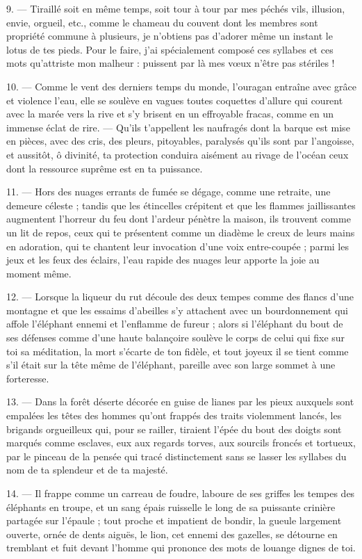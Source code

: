 \documentclass[a4paper, 11pt, oneside, french, landscape, twocolumn]{article}
\begin{document}
9. --- Tiraillé soit en même temps, soit tour à tour par mes péchés vils, illusion, envie, orgueil, etc., comme le chameau du couvent dont les membres sont propriété commune à plusieurs, je n'obtiens pas d'adorer même un instant le lotus de tes pieds. Pour le faire, j'ai spécialement composé ces syllabes et ces mots qu'attriste mon malheur : puissent par là mes vœux n'être pas stériles !

10. --- Comme le vent des derniers temps du monde, l'ouragan entraîne avec grâce et violence l'eau, elle se soulève en vagues toutes coquettes d'allure qui courent avec la marée vers la rive et s'y brisent en un effroyable fracas, comme en un immense éclat de rire. --- Qu'ils t'appellent les naufragés dont la barque est mise en pièces, avec des cris, des pleurs, pitoyables, paralysés qu'ils sont par l'angoisse, et aussitôt, ô divinité, ta protection conduira aisément au rivage de l'océan ceux dont la ressource suprême est en ta puissance.

11. --- Hors des nuages errants de fumée se dégage, comme une retraite, une demeure céleste ; tandis que les étincelles crépitent et que les flammes jaillissantes augmentent l'horreur du feu dont l'ardeur pénètre la maison, ils trouvent comme un lit de repos, ceux qui te présentent comme un diadème le creux de leurs mains en adoration, qui te chantent leur invocation d'une voix entre-coupée ; parmi les jeux et les feux des éclairs, l'eau rapide des nuages leur apporte la joie au moment même.

12. --- Lorsque la liqueur du rut découle des deux tempes comme des flancs d'une montagne et que les essaims d'abeilles s'y attachent avec un bourdonnement qui affole l'éléphant ennemi et l'enflamme de fureur ; alors si l'éléphant du bout de ses défenses comme d'une haute balançoire soulève le corps de celui qui fixe sur toi sa méditation, la mort s'écarte de ton fidèle, et tout joyeux il se tient comme s'il était sur la tête même de l'éléphant, pareille avec son large sommet à une forteresse.

13. --- Dans la forêt déserte décorée en guise de lianes par les pieux auxquels sont empalées les têtes des hommes qu'ont frappés des traits violemment lancés, les brigands orgueilleux qui, pour se railler, tiraient l'épée du bout des doigts sont marqués comme esclaves, eux aux regards torves, aux sourcils froncés et tortueux, par le pinceau de la pensée qui tracé distinctement sans se lasser les syllabes du nom de ta splendeur et de ta majesté.

14. --- Il frappe comme un carreau de foudre, laboure de ses griffes les tempes des éléphants en troupe, et un sang épais ruisselle le long de sa puissante crinière partagée sur l'épaule ; tout proche et impatient de bondir, la gueule largement ouverte, ornée de dents aiguës, le lion, cet ennemi des gazelles, se détourne en tremblant et fuit devant l'homme qui prononce des mots de louange dignes de toi.
\end{document}
